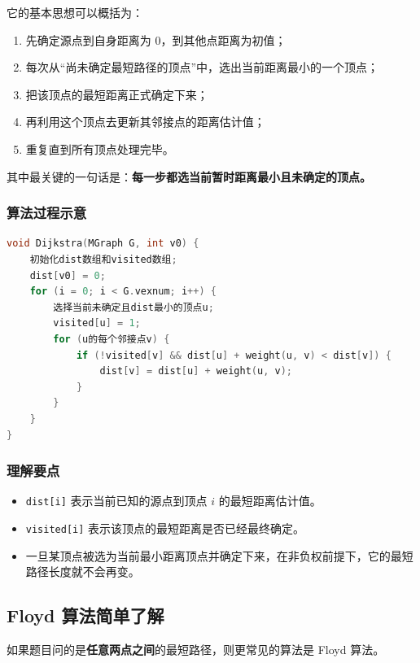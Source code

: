 \documentclass{../../note}
\begin{document}
它的基本思想可以概括为：

\begin{enumerate}
  \item 先确定源点到自身距离为 0，到其他点距离为初值；
  \item 每次从“尚未确定最短路径的顶点”中，选出当前距离最小的一个顶点；
  \item 把该顶点的最短距离正式确定下来；
  \item 再利用这个顶点去更新其邻接点的距离估计值；
  \item 重复直到所有顶点处理完毕。
\end{enumerate}

其中最关键的一句话是：\textbf{每一步都选当前暂时距离最小且未确定的顶点。}

\subsubsection{算法过程示意}

\begin{lstlisting}[language=C]
void Dijkstra(MGraph G, int v0) {
    初始化dist数组和visited数组;
    dist[v0] = 0;
    for (i = 0; i < G.vexnum; i++) {
        选择当前未确定且dist最小的顶点u;
        visited[u] = 1;
        for (u的每个邻接点v) {
            if (!visited[v] && dist[u] + weight(u, v) < dist[v]) {
                dist[v] = dist[u] + weight(u, v);
            }
        }
    }
}
\end{lstlisting}

\subsubsection{理解要点}

\begin{itemize}
  \item \texttt{dist[i]} 表示当前已知的源点到顶点 $i$ 的最短距离估计值。
  \item \texttt{visited[i]} 表示该顶点的最短距离是否已经最终确定。
  \item 一旦某顶点被选为当前最小距离顶点并确定下来，在非负权前提下，它的最短路径长度就不会再变。
\end{itemize}

\subsection{Floyd 算法简单了解}

如果题目问的是\textbf{任意两点之间}的最短路径，则更常见的算法是 Floyd 算法。
\end{document}
